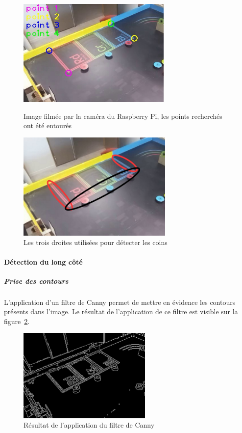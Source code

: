 \documentclass{report}
\begin{document}
\begin{figure}[!h]
   \begin{minipage}[t]{.46\linewidth}
      \begin{center}
      \includegraphics[height=150pt]{image_4_points.jpg}
      \end{center}
      \caption{Image filmée par la caméra du Raspberry Pi, les points recherchés ont été entourés}
      \label{image_init}
   \end{minipage} \hfill
   \begin{minipage}[t]{.46\linewidth}
      \begin{center}
      \includegraphics[height=150pt]{image_3_droites.jpg}
      \end{center}
      \caption{Les trois droites utilisées pour détecter les coins}
      \label{3droites}
   \end{minipage}
\end{figure}


\paragraph{Détection du long côté}
\subparagraph{Prise des contours}
L’application d’un filtre de Canny permet de mettre en évidence les contours présents dans l’image.
Le résultat de l’application de ce filtre est visible sur la figure~\ref{canny1}.
\begin{figure}[!h]
\begin{center} 
\includegraphics[height=130pt]{image_Canny.png}  
\end{center}
\caption{Résultat de l'application du filtre de Canny}
\label{canny1}
\end{figure}
\end{document}
